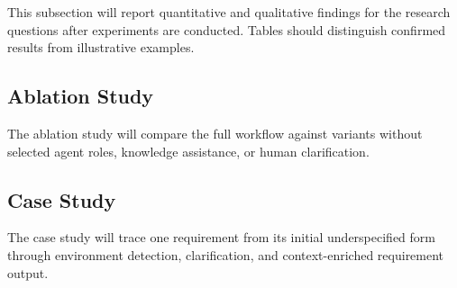 This subsection will report quantitative and qualitative findings for the research questions after experiments are conducted.
Tables should distinguish confirmed results from illustrative examples.

\subsection{Ablation Study}
\label{exp:ablation}

The ablation study will compare the full workflow against variants without selected agent roles, knowledge assistance, or human clarification.

\subsection{Case Study}
\label{exp:case_study}

The case study will trace one requirement from its initial underspecified form through environment detection, clarification, and context-enriched requirement output.
